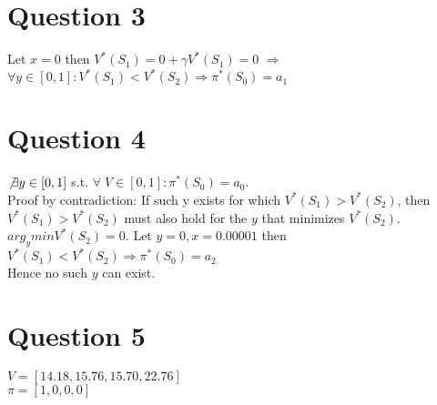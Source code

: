 \documentclass[12pt]{article}
\begin{document}
\section*{Question 3}
Let $x=0$ then $V^{*}(S_1) = 0 + \gamma V^{*}(S_1) = 0$ $\Rightarrow$ $\forall y \in [0,1] : V^{*}(S_1) < V^{*}(S_2) \Rightarrow \pi^{*}(S_0) = a_1$
\section*{Question 4}
$\not \exists y \in [0,1]$ s.t. $\forall \; V \in [0,1] : \pi^{*}(S_0) = a_0$.\\
Proof by contradiction: If such y exists for which $V^{*}(S_1) > V^{*}(S_2)$, then $V^{*}(S_1) > V^{*}(S_2)$ must also hold for the $y$ that minimizes $V^{*}(S_2)$.\\ 
$arg_y min V^{*}(S_2) = 0$. Let $y=0, x=0.00001$ then $V^{*}(S_1) < V^{*}(S_2) \Rightarrow \pi^{*}(S_0) = a_2$ \\
Hence no such $y$ can exist.
\section*{Question 5}
$V = [14.18, 15.76, 15.70, 22.76]$\\
$\pi = [1, 0, 0, 0]$
\end{document}
